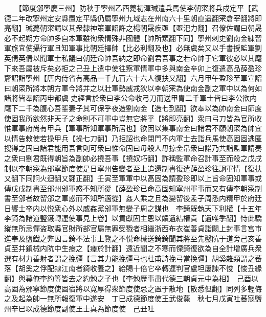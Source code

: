 　　【節度邠寧慶三州】防秋于寧州乙酉薨初渾瑊遣兵馬使李朝寀將兵戍定平【武德二年改寧州定安縣置定平縣仍屬寧州九域志在州南六十里朝直遥翻宷倉宰翻將即亮翻】瑊薨朝寀請以其衆隸神策軍詔許之楊朝晟疾亟【亟汜力翻】召僚佐謂曰朝晟必不起朔方命帥多自本軍雖徇衆情殊非國體【帥所類翻下同】寧州刺史劉南金練習軍旅宜使攝行軍且知軍事比朝廷擇帥【比必利翻及也】必無虞矣又以手書授監軍劉英倩英倩以聞軍士私議曰朝廷命帥吾納之即命劉君吾事之若命帥于它軍彼必以其麾下來吾屬被斥矣必拒之己丑上遣中使往察軍情軍中多與南金辛卯上復遣高品薛盈珍齎詔詣寧州【唐内侍省有高品一千九百六十六人復扶又翻】六月甲午盈珍至軍宣詔曰朝寀所將本朔方軍今將并之以壯軍勢威戎狄以李朝宷為使南金副之軍中以為何如諸將皆奉詔丙申都虞史經言於衆曰李公命收弓刀而送甲胄二千軍士皆曰李公欲内麾下二千為腹心吾輩妻子其可保乎夜造劉南金【造七到翻】欲奉以為帥南金曰節度使固我所欲然非天子之命則不可軍中豈無它將乎【將即亮翻】衆曰弓刀皆為官所收惟軍事府尚有甲兵【軍事所知軍事所居也】欲因以集事南金曰諸君不願朝寀為帥宜以情告敕使若操甲兵【操七刀翻】乃拒詔也命閉門不内軍士去詣兵馬使高固固逃匿搜得之固曰諸君能用吾言則可衆曰惟命固曰毋殺人毋掠金帛衆曰諾乃共詣監軍請奏之衆曰劉君既得朝旨為副帥必撓吾事【撓奴巧翻】詐稱監軍命召計事至而殺之戊戌制以李朝寀為邠寧節度使是日寧州告變者至上追還制書復遣薛盈珍往詗軍情【復扶又翻下同詗火迴翻又翾正翻】壬寅至軍軍中以高固為請盈珍即以上旨命固知軍事或傳戊戌制書至邠州邠軍惑不知所從【薛盈珍已命高固知寧州軍事而又有傳李朝寀制書至邠者故留邠之軍惑而不知所適從】姦人乘之且為變留後孟子周悉内精甲於府廷日饗士卒内以悦衆心外以威姦黨邠軍無變子周之謀也　李錡既執天下利權【十五年李錡為諸道鹽鐵轉運使事見上卷】以貢獻固主恩以饋遺結權貴【遺唯季翻】恃此驕縱無所忌憚盗取縣官財所部官屬無罪受戮者相繼浙西布衣崔善貞詣闕上封事言宫市進奉及鹽鐵之弊因言錡不法事上覽之不悦命械送錡錡聞其將至先鑿阬于道旁己亥善貞至并鎻械内阬中生瘞之【瘞於計翻】遠近聞之不寒而慄錡復欲為自全計增廣兵衆選有材力善射者謂之挽彊【言其力能挽彊弓也杜甫詩挽弓當挽彊】胡奚雜類謂之蕃落【胡奚之俘配隸江南者錡收養之】給賜十倍它卒轉運判官盧坦屢諫不悛【悛丑緣翻】與幕僚李約等皆去之約勉之子也【李勉歷事肅代德三朝貞元中為相】　己酉以高固為邠寧節度使固宿將以寛厚得衆節度使忌之置于散地【散悉但翻】同列多輕侮之及起為帥一無所報復軍中遂安　丁巳成德節度使王武俊薨　秋七月戊寅吐蕃寇鹽州辛巳以成德節度副使王士真為節度使　己丑吐

